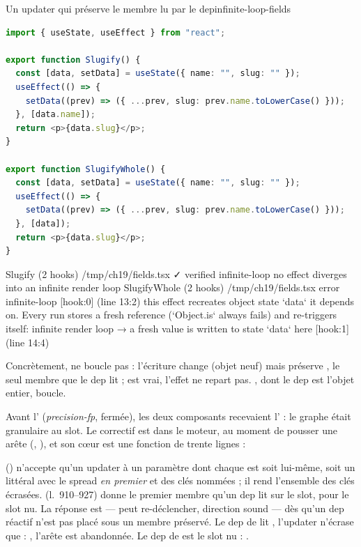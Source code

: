 \begin{exemple}{Un updater qui préserve le membre lu par le dep}{infinite-loop-fields}
\begin{lstlisting}[language=TypeScript,caption={\file{/tmp/ch19/fields.tsx}},label={lst:infinite-loop-fields}]
import { useState, useEffect } from "react";

export function Slugify() {
  const [data, setData] = useState({ name: "", slug: "" });
  useEffect(() => {
    setData((prev) => ({ ...prev, slug: prev.name.toLowerCase() }));
  }, [data.name]);
  return <p>{data.slug}</p>;
}

export function SlugifyWhole() {
  const [data, setData] = useState({ name: "", slug: "" });
  useEffect(() => {
    setData((prev) => ({ ...prev, slug: prev.name.toLowerCase() }));
  }, [data]);
  return <p>{data.slug}</p>;
}
\end{lstlisting}
\begin{sortie}
  Slugify  (2 hooks)  /tmp/ch19/fields.tsx  ✓
    verified  infinite-loop  no effect diverges into an infinite render loop
  SlugifyWhole  (2 hooks)  /tmp/ch19/fields.tsx
    error  infinite-loop  [hook:0]  (line 13:2)  this effect recreates object state `data` it depends on. Every run stores a fresh reference (`Object.is` always fails) and re-triggers itself: infinite render loop
       → a fresh value is written to state `data` here [hook:1] (line 14:4)
\end{sortie}
Concrètement,  ne boucle pas : l'écriture change  (objet neuf) mais préserve , le seul membre que le dep lit ;  est vrai, l'effet ne repart pas. , dont le dep est l'objet entier, boucle.
\end{exemple}

Avant l' (\emph{precision-fp}, fermée), les deux composants recevaient l'\Error{} : le graphe était granulaire au slot. Le correctif est dans le moteur, au moment de pousser une arête  (, ), et son cœur est une fonction de trente lignes :


 () n'accepte qu'un updater à un paramètre dont chaque  est soit  lui-même, soit un littéral  avec le spread \emph{en premier} et des clés nommées ; il rend l'ensemble des clés écrasées.  (l.~910--927) donne le premier membre qu'un dep lit sur le slot,  pour le slot nu. La réponse est  --- \og peut re-déclencher\fg, direction sound --- dès qu'un dep réactif n'est pas placé sous un membre préservé. Le dep  de  lit , l'updater n'écrase que  : , l'arête est abandonnée. Le dep  de  est le slot nu : .

